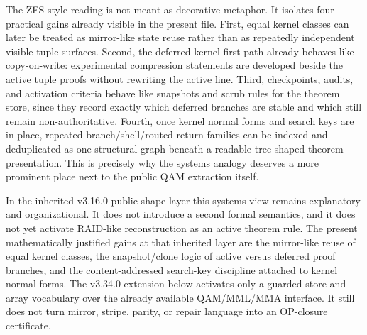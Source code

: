 \begin{remark}\label{rem:qam-zfs-utility}
The ZFS-style reading is not meant as decorative metaphor. It isolates four practical gains already visible in the present file. First, equal kernel classes can later be treated as mirror-like state reuse rather than as repeatedly independent visible tuple surfaces. Second, the deferred kernel-first path already behaves like copy-on-write: experimental compression statements are developed beside the active tuple proofs without rewriting the active line. Third, checkpoints, audits, and activation criteria behave like snapshots and scrub rules for the theorem store, since they record exactly which deferred branches are stable and which still remain non-authoritative. Fourth, once kernel normal forms and search keys are in place, repeated branch/shell/routed return families can be indexed and deduplicated as one structural graph beneath a readable tree-shaped theorem presentation. This is precisely why the systems analogy deserves a more prominent place next to the public QAM extraction itself.
\end{remark}

\begin{remark}\label{rem:qam-vm-os-scope}
In the inherited v3.16.0 public-shape layer this systems view remains explanatory and organizational. It does not introduce a second formal semantics, and it does not yet activate RAID-like reconstruction as an active theorem rule. The present mathematically justified gains at that inherited layer are the mirror-like reuse of equal kernel classes, the snapshot/clone logic of active versus deferred proof branches, and the content-addressed search-key discipline attached to kernel normal forms. The v3.34.0 extension below activates only a guarded store-and-array vocabulary over the already available QAM/MML/MMA interface. It still does not turn mirror, stripe, parity, or repair language into an OP-closure certificate.
\end{remark}


